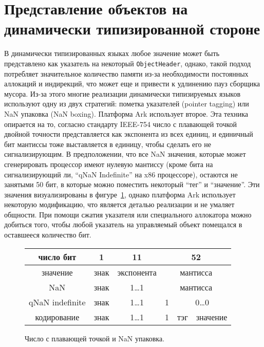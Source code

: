 \documentclass[times,specification,annotation]{itmo-student-thesis}
\begin{document}
\section{Представление объектов на динамически типизированной стороне}\label{nan-boxing-explanation}
В динамически типизированных языках любое значение может быть представлено как указатель на некоторый \texttt{ObjectHeader}, однако, такой подход потребляет значительное количество памяти из-за необходимости постоянных аллокаций и индирекций, что может еще и привести к удлинению пауз сборщика мусора. Из-за этого многие реализации динамически типизируемых языков~\cite{luajit-nan-box,v8-pointer-tagging} используют одну из двух стратегий: пометка указателей (pointer tagging) или NaN упаковка (NaN boxing). Платформа Ark использует второе. Эта техника опирается на то, согласно стандарту IEEE-754 число с плавающей точкой двойной точности представляется как экспонента из всех единиц, и единичный бит мантиссы тоже выставляется в единицу, чтобы сделать его не сигнализирующим. В предположении, что все NaN значения, которые может сгенерировать процессор имеют нулевую мантиссу (кроме бита на сигнализирующий ли, ``qNaN Indefinite'' на x86 процессоре), остаются не занятыми 50 бит, в которые можно поместить некоторый ``тег'' и ``значение''. Эти значения визуализированы в фигуре~\ref{fig:nan-explain}, однако платформа Ark использует некоторую модификацию, что является деталью реализации и не умаляет общности. При помощи сжатия указателя или специального аллокатора можно добиться того, чтобы любой указатель на управляемый объект помещался в оставшееся количество бит.\\
\begin{figure}[!h]
	\caption{Число с плавающей точкой и NaN упаковка.}\label{fig:nan-explain}
	\centering
	\begin{tabular}{|c|c|c|c|c|c|}
		\hline
		число бит & 1 & 11 & \multicolumn{3}{c|}{52} \\
		\hline
		значение & знак & экспонента & \multicolumn{3}{c|}{мантисса} \\
		\hline
		NaN & знак & 1\dots 1 & \multicolumn{3}{c|}{мантисса} \\
		\hline
		qNaN indefinite & знак & 1\dots 1 & 1 & \multicolumn{2}{c|}{0\dots0} \\
		\hline
		кодирование & знак & 1\dots 1 & 1 & тэг & значение \\
		\hline
	\end{tabular}
\end{figure}
\end{document}
